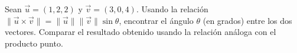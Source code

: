 Sean $\vec{u} = (1, 2, 2)$ y $\vec{v} = (3, 0, 4)$. Usando la relación $\|\vec{u} \times \vec{v}\| = \|\vec{u}\|\|\vec{v}\|\sin\theta$, encontrar el ángulo $\theta$ (en grados) entre los dos vectores. Comparar el resultado obtenido usando la relación análoga con el producto punto.